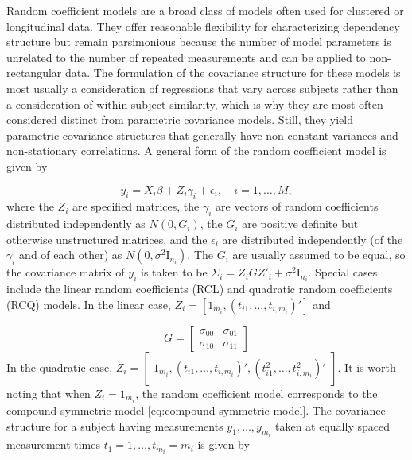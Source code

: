 \documentclass[../chapter-1-introduction.tex]{subfiles}
\begin{document}
\bigskip

Random coefficient models are a broad class of models often used for clustered or longitudinal data. They offer reasonable flexibility for characterizing dependency structure but remain parsimonious because the number of model parameters is unrelated to the number of repeated measurements and can be applied to non-rectangular data.  The formulation of the covariance structure for these models is most usually a consideration of regressions that vary across subjects rather than a consideration of within-subject similarity, which is why they are most often considered distinct from parametric covariance models. Still, they yield parametric covariance structures that generally have non-constant variances and non-stationary correlations.  A general form of the random coefficient model is given by 

\begin{equation}
y_i = X_i\beta + Z_i \gamma_i + \epsilon_i, \quad i = 1, \dots, M,
\end{equation}
\noindent
where the $Z_i$ are specified matrices, the $\gamma_i$ are vectors of random coefficients distributed independently as $N \left(0, G_i\right)$, the $G_i$ are positive definite but otherwise unstructured matrices, and the $\epsilon_i$ are distributed independently (of the $\gamma_i$ and of each other) as $N \left(0, \sigma^2 \mathrm{I}_{n_i}\right)$. The $G_i$ are usually assumed to be equal, so the covariance matrix of $y_i$ is taken to be $\Sigma_i = Z_i GZ'_i + \sigma^2 \mathrm{I}_{n_i}$. Special cases include the linear random coefficients (RCL) and quadratic random coefficients (RCQ) models. In the linear case, $Z_i = \left[1_{m_i} , \left(t_{i1},\dots,t_{i, m_i}\right)'\right]$ and 

\begin{equation*}
G = \begin{bmatrix}
\sigma_{00} & \sigma_{01} \\
\sigma_{10} & \sigma_{11} 
\end{bmatrix}
\end{equation*}
\noindent
In the quadratic case, $Z_i =\begin{bmatrix}1_{m_i}, \left(t_{i1}, \dots, t_{i,m_i}\right)', \left(t^2_{i1}, \dots, t^2_{i,m_i}\right)'\end{bmatrix}$. It is worth noting that when $Z_i = 1_{m_i}$, the random coefficient model corresponds to the compound symmetric model \ref{eq:compound-symmetric-model}. The covariance structure for a subject having measurements $y_1,\dots, y_{m_i}$ taken at equally spaced measurement times $t_1 = 1, \dots,t_{m_i} = m_i$ is given by  
\end{document}
